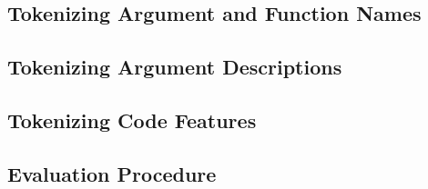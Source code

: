 \subsection{Tokenizing Argument and Function Names} %
\label{sub:tokenizing_textual_input}

\subsection{Tokenizing Argument Descriptions} %
\label{sub:tokenizing_argument_descriptions}

\subsection{Tokenizing Code Features} %
\label{sub:tokenizing_code_features}

\subsection{Evaluation Procedure} %
\label{sub:evaluation_procedure}







    
